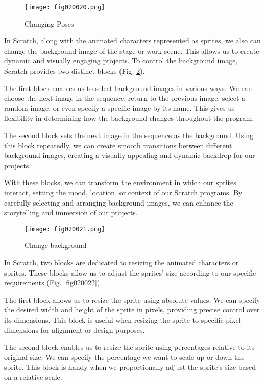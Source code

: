 \begin{figure}[H]
   \centering
   \texttt{[image: fig020020.png]}
   \caption{Changing Poses}
\label{fig020020}
\end{figure}

In Scratch, along with the animated characters represented as sprites, we also can change the background image of the stage or work scene. This allows us to create dynamic and visually engaging projects. To control the background image, Scratch provides two distinct blocks (Fig. \ref{fig020021}).

The first block enables us to select background images in various ways. We can choose the next image in the sequence, return to the previous image, select a random image, or even specify a specific image by its name. This gives us flexibility in determining how the background changes throughout the program.

The second block sets the next image in the sequence as the background. Using this block repeatedly, we can create smooth transitions between different background images, creating a visually appealing and dynamic backdrop for our projects.

With these blocks, we can transform the environment in which our sprites interact, setting the mood, location, or context of our Scratch programs. By carefully selecting and arranging background images, we can enhance the storytelling and immersion of our projects.

\begin{figure}[H]
   \centering
   \texttt{[image: fig020021.png]}
   \caption{Change background}
\label{fig020021}
\end{figure}

In Scratch, two blocks are dedicated to resizing the animated characters or sprites. These blocks allow us to adjust the sprites' size according to our specific requirements (Fig. \ref{fig020022}).

The first block allows us to resize the sprite using absolute values. We can specify the desired width and height of the sprite in pixels, providing precise control over its dimensions. This block is useful when resizing the sprite to specific pixel dimensions for alignment or design purposes.

The second block enables us to resize the sprite using percentages relative to its original size. We can specify the percentage we want to scale up or down the sprite. This block is handy when we proportionally adjust the sprite's size based on a relative scale.

